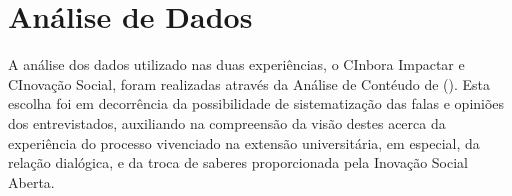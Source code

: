\section{Análise de Dados}
\label{resultadoanalise}

A análise dos dados utilizado nas duas experiências, o CInbora Impactar e CInovação Social, foram realizadas através da Análise de Contéudo de \citeauthor{bardin2011} (\citeyear{bardin2011}). Esta escolha foi em decorrência da possibilidade de sistematização das falas e opiniões dos entrevistados, auxiliando na compreensão da visão destes acerca da experiência do processo vivenciado na extensão universitária, em especial, da relação dialógica, e da troca de saberes proporcionada pela Inovação Social Aberta.




